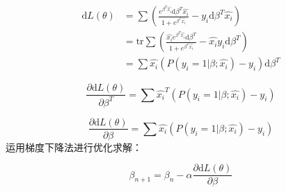 \begin{equation}\label{key}
\begin{split}
\mathrm{d}L(\theta)
&=\sum \left(
\frac{e^{\beta^T\hat{x_i}} \mathrm{d}\beta^T\hat{x_i}}{1+e^{\beta^T\hat{x_i}} }
- y_i \mathrm{d} \beta^T \hat{x_i}
\right)\\
&=\mathrm{tr}\sum \left(
\frac{\hat{x_i}e^{\beta^T\hat{x_i}} \mathrm{d}\beta^T}{1+e^{\beta^T\hat{x_i}} }
- \hat{x_i}y_i \mathrm{d} \beta^T
\right)\\
&=\sum \hat{x_i}(P(y_i=1|\beta;\hat{x_i})-y_i)\mathrm{d}\beta^T
\end{split}
\end{equation}

\begin{equation*}
\frac{\partial \mathrm{d}L(\theta)}{\partial \beta^T}=\sum \hat{x_i}^T(P(y_i=1|\beta;\hat{x_i})-y_i)
\end{equation*}

\begin{equation}
\frac{\partial \mathrm{d}L(\theta)}{\partial \beta}=\sum \hat{x_i}(P(y_i=1|\beta;\hat{x_i})-y_i)
\end{equation}
运用梯度下降法进行优化求解：

\[
\beta_{n+1}=\beta_{n}-\alpha\frac{\partial \mathrm{d}L(\theta)}{\partial \beta}
\]
